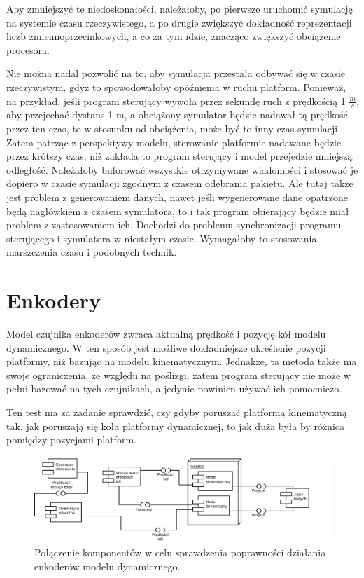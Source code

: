 		Aby zmniejszyć te niedoskonałości, należałoby, po pierwsze uruchomić symulację na systemie czasu rzeczywistego, a po drugie zwiększyć 
		dokładność reprezentacji liczb zmiennoprzecinkowych, a co za tym idzie, znacząco zwiększyć obciążenie procesora.
		
		Nie można nadal pozwolić na to, aby symulacja przestała odbywać się w czasie rzeczywistym, gdyż to spowodowałoby opóźnienia w ruchu platform.
		Ponieważ, na przykład, jeśli program sterujący wywoła przez sekundę ruch z prędkością 1 $\frac{m}{s}$, aby przejechać dystans 1 m,
		a obciążony symulator będzie nadawał tą prędkość przez ten czas, to w stosunku od obciążenia, może być to inny czas symulacji.
		Zatem patrząc z perspektywy modelu, sterowanie platformie nadawane będzie przez krótszy czas, niż zakłada to program sterujący i model przejedzie mniejszą odległość.
		Należałoby buforować wszystkie otrzymywane wiadomości i stosować je dopiero w czasie symulacji zgodnym z czasem odebrania pakietu. 
		Ale tutaj także jest problem z generowaniem danych, nawet jeśli wygenerowane dane opatrzone będą nagłówkiem z czasem symulatora, to i tak program obierający będzie miał
		problem z zastosowaniem ich. Dochodzi do problemu synchronizacji programu sterującego i symulatora w niestałym czasie. 
		Wymagałoby to stosowania marszczenia czasu i podobnych technik.
		
\section{Enkodery}
	Model czujnika enkoderów zwraca aktualną prędkość i pozycję kół modelu dynamicznego.
	W ten sposób jest możliwe dokładniejsze określenie pozycji platformy, niż bazując na modelu kinematycznym.
	Jednakże, ta metoda także ma swoje ograniczenia, ze względu na poślizgi, zatem program sterujący nie może w pełni bazować na tych czujnikach, a jedynie powinien używać ich pomocniczo.
	
	Ten test ma za zadanie sprawdzić, czy gdyby poruszać platformą kinematyczną tak, jak poruszają się koła platformy dynamicznej, to jak duża była by różnica pomiędzy 
	pozycjami platform.
	
	\begin{figure}[H]
		\centering
		\includegraphics[width=\textwidth]{uml/encoders.pdf}
			\caption{Połączenie komponentów w celu sprawdzenia poprawności działania enkoderów modelu dynamicznego.}
		\label{plot:encoders}
	\end{figure}
	
